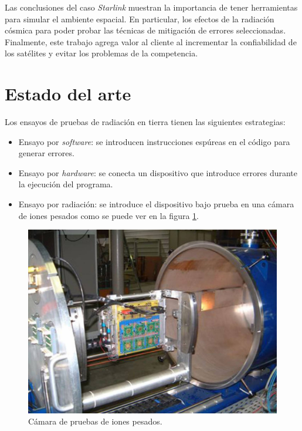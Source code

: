 Las conclusiones del caso \emph{Starlink} muestran la importancia de tener herramientas para simular el ambiente espacial.
En particular, los efectos de la radiación cósmica para poder probar las técnicas de mitigación de errores seleccionadas.
Finalmente, este trabajo agrega valor al cliente al incrementar la confiabilidad de los satélites y evitar los problemas de la competencia.

\newpage

\section{Estado del arte}
\label{sec:arte}

Los ensayos de pruebas de radiación en tierra tienen las siguientes estrategias:
\begin{itemize}
    \item Ensayo por \emph{software}: se introducen instrucciones espúreas en el código para generar errores.
    \item Ensayo por \emph{hardware}: se conecta un dispositivo que introduce errores durante la ejecución del programa.
    \item Ensayo por radiación: se introduce el dispositivo bajo prueba en una cámara de iones pesados como se puede ver en la figura \ref{fig:iones}.
\end{itemize}

\begin{figure}[htbp]
	\centering
	\includegraphics[width=\textwidth]{./Figures/heavy_ion_latchup_tests_in_louvain_la_neuve.jpg}
    \caption{Cámara de pruebas de iones pesados\protect\footnotemark.}
	\label{fig:iones}
\end{figure}

